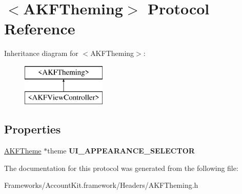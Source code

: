 \hypertarget{protocol_a_k_f_theming-p}{}\section{$<$A\+K\+F\+Theming$>$ Protocol Reference}
\label{protocol_a_k_f_theming-p}
Inheritance diagram for $<$A\+K\+F\+Theming$>$\+:\begin{figure}[H]
\begin{center}
\leavevmode
\includegraphics[height=2.000000cm]{protocol_a_k_f_theming-p}
\end{center}
\end{figure}
\subsection*{Properties}
\begin{DoxyCompactItemize}
\item 
\hypertarget{protocol_a_k_f_theming-p_a60a77f3c67225cf03df3fa0ac9306d17}{}\hyperlink{interface_a_k_f_theme}{A\+K\+F\+Theme} $\ast$theme {\bfseries U\+I\+\_\+\+A\+P\+P\+E\+A\+R\+A\+N\+C\+E\+\_\+\+S\+E\+L\+E\+C\+T\+O\+R}\label{protocol_a_k_f_theming-p_a60a77f3c67225cf03df3fa0ac9306d17}

\end{DoxyCompactItemize}


The documentation for this protocol was generated from the following file\+:\begin{DoxyCompactItemize}
\item 
Frameworks/\+Account\+Kit.\+framework/\+Headers/A\+K\+F\+Theming.\+h\end{DoxyCompactItemize}
